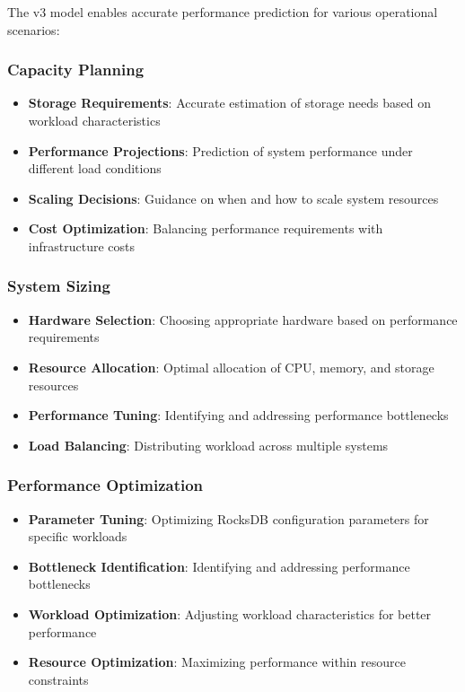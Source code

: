 \documentclass[11pt]{article}
\begin{document}
The v3 model enables accurate performance prediction for various operational scenarios:

\subsubsection{Capacity Planning}
\begin{itemize}
    \item \textbf{Storage Requirements}: Accurate estimation of storage needs based on workload characteristics
    \item \textbf{Performance Projections}: Prediction of system performance under different load conditions
    \item \textbf{Scaling Decisions}: Guidance on when and how to scale system resources
    \item \textbf{Cost Optimization}: Balancing performance requirements with infrastructure costs
\end{itemize}

\subsubsection{System Sizing}
\begin{itemize}
    \item \textbf{Hardware Selection}: Choosing appropriate hardware based on performance requirements
    \item \textbf{Resource Allocation}: Optimal allocation of CPU, memory, and storage resources
    \item \textbf{Performance Tuning}: Identifying and addressing performance bottlenecks
    \item \textbf{Load Balancing}: Distributing workload across multiple systems
\end{itemize}

\subsubsection{Performance Optimization}
\begin{itemize}
    \item \textbf{Parameter Tuning}: Optimizing RocksDB configuration parameters for specific workloads
    \item \textbf{Bottleneck Identification}: Identifying and addressing performance bottlenecks
    \item \textbf{Workload Optimization}: Adjusting workload characteristics for better performance
    \item \textbf{Resource Optimization}: Maximizing performance within resource constraints
\end{itemize}
\end{document}
